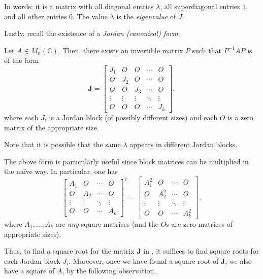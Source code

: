 \documentclass[12pt]{article}
\begin{document}
In words: it is a matrix with all diagonal entries $\lambda$, all superdiagonal entries $1$, and all other entries $0$. The value $\lambda$ is the \emph{eigenvalue} of $J$.

Lastly, recall the existence of a \emph{Jordan (canonical) form}.

\begin{thm} \label{thm:jordan-form}
	Let $A \in M_{n}(\mathbb{C})$. Then, there exists an invertible matrix $P$ such that $P^{-1} A P$ is of the form
	\begin{equation} \label{eq:01}
		\mathbf{J} = \begin{bmatrix}
			J_{1} & O & O & \cdots & O \\
			O & J_{2} & O & \cdots & O \\
			O & O & J_{3} & \cdots & O \\
			\vdots & \vdots & \vdots & \ddots & \vdots \\
			O & O & O & \cdots & J_{k}
		\end{bmatrix},
	\end{equation}
	where each $J_{i}$ is a Jordan block (of possibly different sizes) and each $O$ is a zero matrix of the appropriate size.
\end{thm}
Note that it is possible that the same $\lambda$ appears in different Jordan blocks. 

The above form is particularly useful since block matrices can be multiplied in the na\"ive way. In particular, one has
\begin{equation} \label{eq:03}
	\begin{bmatrix}
		A_{1} & O & \cdots & O \\
		O & A_{2} & \cdots & O \\
		\vdots & \vdots & \ddots & \vdots \\
		O & O & \cdots & A_{k}
	\end{bmatrix}^{2} 
	=
	\begin{bmatrix}
		A_{1}^{2} & O & \cdots & O \\
		O & A_{2}^{2} & \cdots & O \\
		\vdots & \vdots & \ddots & \vdots \\
		O & O & \cdots & A_{k}^{2}
	\end{bmatrix},
\end{equation}
where $A_{1}, \ldots, A_{k}$ are \emph{any} square matrices (and the $O$s are zero matrices of appropriate sizes).

Thus, to find a square root for the matrix $\mathbf{J}$ in , it suffices to find square roots for each Jordan block $J_{i}$. Moreover, once we have found a square root of $\mathbf{J}$, we also have a square of $A$, by the following observation.
\end{document}

